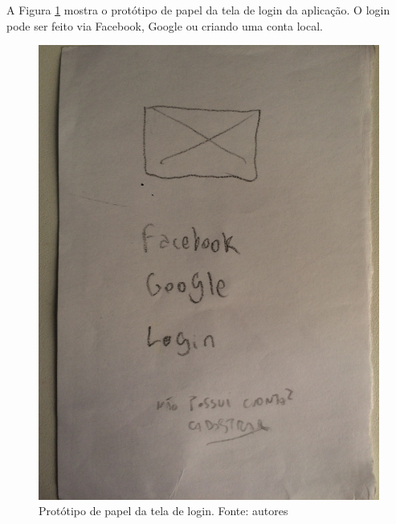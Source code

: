 A Figura \ref{img:prototipo_de_papel_tela_de_login} mostra o protótipo de papel da tela de login da aplicação. O login pode ser feito via Facebook, Google ou criando uma conta local.
\begin{figure}[H]
    \centering
    \includegraphics[scale=0.05, angle=-90]{figuras/prototipo_papel_login.jpg}
    \caption[Protótipo de papel da tela de login]{Protótipo de papel da tela de login. Fonte: autores}
    \label{img:prototipo_de_papel_tela_de_login}
\end{figure}
\pagebreak

